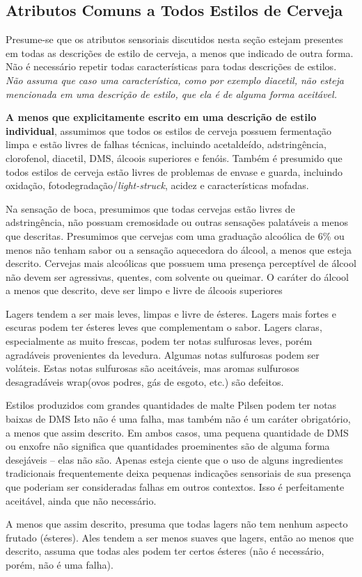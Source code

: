 \subsection*{Atributos Comuns a Todos Estilos de Cerveja}

Presume-se que os atributos sensoriais discutidos nesta seção estejam presentes em todas as descrições de estilo de cerveja, a menos que indicado de outra forma. Não é necessário repetir todas características para todas descrições de estilos. \textit{Não assuma que caso uma característica, como por exemplo diacetil, não esteja mencionada em uma descrição de estilo, que ela é de alguma forma aceitável.}

\textbf{A menos que explicitamente escrito em uma descrição de estilo individual}, assumimos que todos os estilos de cerveja possuem fermentação limpa e estão livres de falhas técnicas, incluindo acetaldeído, adstringência, clorofenol, diacetil, DMS, álcoois superiores e fenóis. Também é presumido que todos estilos de cerveja estão livres de problemas de envase e guarda, incluindo oxidação, fotodegradação/\textit{light-struck}, acidez e características mofadas.

Na sensação de boca, presumimos que todas cervejas estão livres de adstringência, não possuam cremosidade ou outras sensações palatáveis a menos que descritas. Presumimos que cervejas com uma graduação alcoólica de 6\% ou menos não tenham sabor ou a sensação aquecedora do álcool, a menos que esteja descrito. Cervejas mais alcoólicas que possuem uma presença perceptível de álcool não devem ser agressivas, quentes, com solvente ou queimar. O caráter do álcool a menos que descrito, deve ser limpo e livre de álcoois superiores

Lagers tendem a ser mais leves, limpas e livre de ésteres.  Lagers mais fortes e escuras podem ter ésteres leves que complementam o sabor. Lagers claras, especialmente as muito frescas, podem ter notas sulfurosas leves, porém agradáveis provenientes da levedura. Algumas notas sulfurosas podem ser voláteis. Estas notas sulfurosas são aceitáveis, mas aromas sulfurosos desagradáveis wrap(ovos podres, gás de esgoto, etc.) são defeitos.

Estilos produzidos com grandes quantidades de malte Pilsen podem ter notas baixas de DMS Isto não é uma falha, mas também não é um caráter obrigatório, a menos que assim descrito. Em ambos casos, uma pequena quantidade de DMS ou enxofre não significa que quantidades proeminentes são de alguma forma desejáveis – elas não são. Apenas esteja ciente que o uso de alguns ingredientes tradicionais frequentemente deixa pequenas indicações sensoriais de sua presença que poderiam ser consideradas falhas em outros contextos. Isso é perfeitamente aceitável, ainda que não necessário.

A menos que assim descrito, presuma que todas lagers não tem nenhum aspecto frutado (ésteres). Ales tendem a ser menos suaves que lagers, então ao menos que descrito, assuma que todas ales podem ter certos ésteres (não é necessário, porém, não é uma falha).
